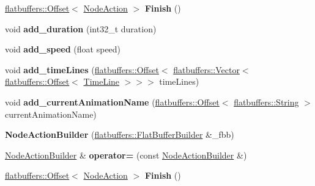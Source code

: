 \begin{DoxyCompactItemize}
\mbox{\label{structflatbuffers_1_1NodeActionBuilder_a4a3b87a9a15f9399be380ed71f48fa5b}} 
\hyperlink{structflatbuffers_1_1Offset}{flatbuffers\+::\+Offset}$<$ \hyperlink{structflatbuffers_1_1NodeAction}{Node\+Action} $>$ {\bfseries Finish} ()
\item 
\mbox{\label{structflatbuffers_1_1NodeActionBuilder_af724c6df26fd607066831a7feefb3fdf}} 
void {\bfseries add\+\_\+duration} (int32\+\_\+t duration)
\item 
\mbox{\label{structflatbuffers_1_1NodeActionBuilder_a37b56801b06d9cd3174ad3be6d860490}} 
void {\bfseries add\+\_\+speed} (float speed)
\item 
\mbox{\label{structflatbuffers_1_1NodeActionBuilder_ada180e2edfd2a067007804f6c56688a9}} 
void {\bfseries add\+\_\+time\+Lines} (\hyperlink{structflatbuffers_1_1Offset}{flatbuffers\+::\+Offset}$<$ \hyperlink{classflatbuffers_1_1Vector}{flatbuffers\+::\+Vector}$<$ \hyperlink{structflatbuffers_1_1Offset}{flatbuffers\+::\+Offset}$<$ \hyperlink{structflatbuffers_1_1TimeLine}{Time\+Line} $>$$>$$>$ time\+Lines)
\item 
\mbox{\label{structflatbuffers_1_1NodeActionBuilder_a2f41fd9a4334b4220ac490b7fdfad1f9}} 
void {\bfseries add\+\_\+current\+Animation\+Name} (\hyperlink{structflatbuffers_1_1Offset}{flatbuffers\+::\+Offset}$<$ \hyperlink{structflatbuffers_1_1String}{flatbuffers\+::\+String} $>$ current\+Animation\+Name)
\item 
\mbox{\label{structflatbuffers_1_1NodeActionBuilder_a68f8c516007734c2689d13c82fe80f02}} 
{\bfseries Node\+Action\+Builder} (\hyperlink{classflatbuffers_1_1FlatBufferBuilder}{flatbuffers\+::\+Flat\+Buffer\+Builder} \&\+\_\+fbb)
\item 
\mbox{\label{structflatbuffers_1_1NodeActionBuilder_a889e4b928bbc6e5017a9842d18912fac}} 
\hyperlink{structflatbuffers_1_1NodeActionBuilder}{Node\+Action\+Builder} \& {\bfseries operator=} (const \hyperlink{structflatbuffers_1_1NodeActionBuilder}{Node\+Action\+Builder} \&)
\item 
\mbox{\label{structflatbuffers_1_1NodeActionBuilder_a4a3b87a9a15f9399be380ed71f48fa5b}} 
\hyperlink{structflatbuffers_1_1Offset}{flatbuffers\+::\+Offset}$<$ \hyperlink{structflatbuffers_1_1NodeAction}{Node\+Action} $>$ {\bfseries Finish} ()
\end{DoxyCompactItemize}
